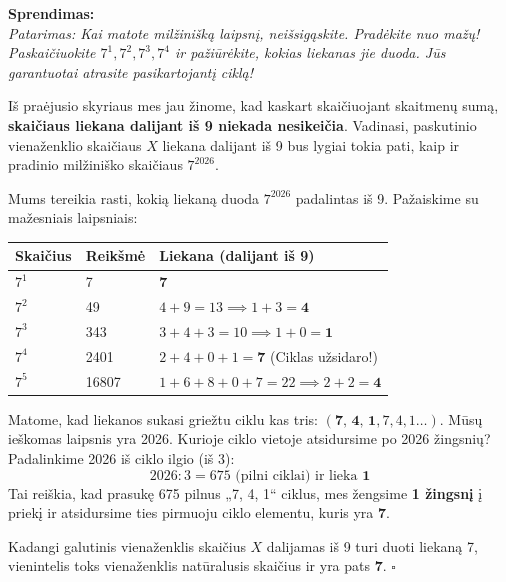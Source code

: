 \documentclass[11pt,a4paper]{scrartcl}
\newenvironment{solution}
    {\begin{list}{}{\setlength{\leftmargin}{10pt}\setlength{\rightmargin}{10pt}}\item[]}
    {\end{list}}
\begin{document}
\begin{solution}
\textbf{Sprendimas:} \\
\textit{Patarimas: Kai matote milžinišką laipsnį, neišsigąskite. Pradėkite nuo mažų! Paskaičiuokite $7^1, 7^2, 7^3, 7^4$ ir pažiūrėkite, kokias liekanas jie duoda. Jūs garantuotai atrasite pasikartojantį ciklą!}

Iš praėjusio skyriaus mes jau žinome, kad kaskart skaičiuojant skaitmenų sumą, \textbf{skaičiaus liekana dalijant iš 9 niekada nesikeičia}. Vadinasi, paskutinio vienaženklio skaičiaus $X$ liekana dalijant iš 9 bus lygiai tokia pati, kaip ir pradinio milžiniško skaičiaus $7^{2026}$.

Mums tereikia rasti, kokią liekaną duoda $7^{2026}$ padalintas iš 9. Pažaiskime su mažesniais laipsniais:

\begin{center}
\begin{tabular}{|l|l|l|}
\hline
\textbf{Skaičius} & \textbf{Reikšmė} & \textbf{Liekana (dalijant iš 9)} \\ \hline
$7^1$ & 7 & \textbf{7} \\ \hline
$7^2$ & 49 & $4+9 = 13 \implies 1+3 = \textbf{4}$ \\ \hline
$7^3$ & 343 & $3+4+3 = 10 \implies 1+0 = \textbf{1}$ \\ \hline
$7^4$ & 2401 & $2+4+0+1 = \textbf{7}$ (Ciklas užsidaro!) \\ \hline
$7^5$ & 16807 & $1+6+8+0+7 = 22 \implies 2+2 = \textbf{4}$ \\ \hline
\end{tabular}
\end{center}

Matome, kad liekanos sukasi griežtu ciklu kas tris: $(\textbf{7, 4, 1}, 7, 4, 1 \dots)$.
Mūsų ieškomas laipsnis yra 2026. Kurioje ciklo vietoje atsidursime po 2026 žingsnių? Padalinkime 2026 iš ciklo ilgio (iš 3):
\[ 2026 : 3 = 675 \text{ (pilni ciklai) ir lieka } \mathbf{1} \]
Tai reiškia, kad prasukę 675 pilnus „7, 4, 1“ ciklus, mes žengsime \textbf{1 žingsnį} į priekį ir atsidursime ties pirmuoju ciklo elementu, kuris yra \textbf{7}.

Kadangi galutinis vienaženklis skaičius $X$ dalijamas iš 9 turi duoti liekaną 7, vienintelis toks vienaženklis natūralusis skaičius ir yra pats \textbf{7}. \hfill $\square$
\end{solution}
\end{document}
